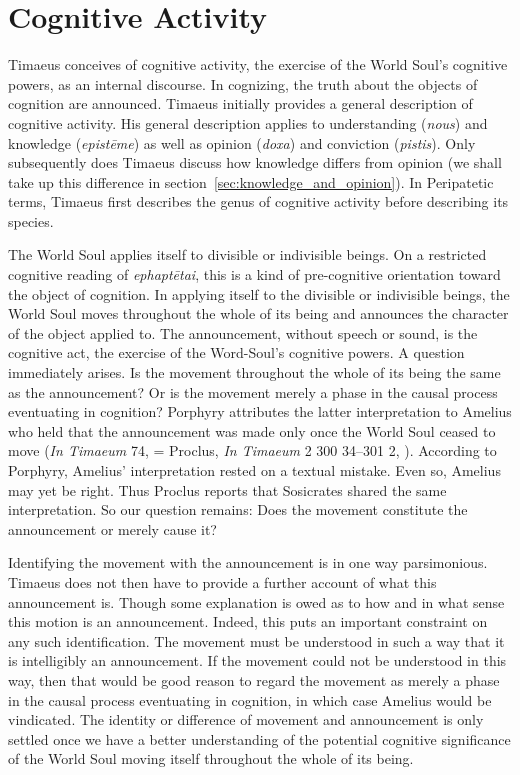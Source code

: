 


\section{Cognitive Activity} %
\label{sec:cognition}

Timaeus conceives of cognitive activity, the exercise of the World Soul's cognitive powers, as an internal discourse. In cognizing, the truth about the objects of cognition are announced. Timaeus initially provides a general description of cognitive activity. His general description applies to understanding (\emph{nous}) and knowledge (\emph{epistēme}) as well as opinion (\emph{doxa}) and conviction (\emph{pistis}). Only subsequently does Timaeus discuss how knowledge differs from opinion (we shall take up this difference in section~\ref{sec:knowledge_and_opinion}). In Peripatetic terms, Timaeus first describes the genus of cognitive activity before describing its species.

The World Soul applies itself to divisible or indivisible beings. On a restricted cognitive reading of \emph{ephaptētai}, this is a kind of pre-cognitive orientation toward the object of cognition. In applying itself to the divisible or indivisible beings, the World Soul moves throughout the whole of its being and announces the character of the object applied to. The announcement, without speech or sound, is the cognitive act, the exercise of the Word-Soul's cognitive powers. A question immediately arises. Is the movement throughout the whole of its being the same as the announcement? Or is the movement merely a phase in the causal process eventuating in cognition? Porphyry attributes the latter interpretation to Amelius who held that the announcement was made only once the World Soul ceased to move (\emph{In Timaeum} 74, \citealt{Sodano:1964mf} = Proclus, \emph{In Timaeum} 2 300 34--301 2, \citealt{Diehl:1903re}). According to Porphyry, Amelius' interpretation rested on a textual mistake. Even so, Amelius may yet be right. Thus Proclus reports that Sosicrates shared the same interpretation. So our question remains: Does the movement constitute the announcement or merely cause it?

Identifying the movement with the announcement is in one way parsimonious. Timaeus does not then have to provide a further account of what this announcement is. Though some explanation is owed as to how and in what sense this motion is an announcement. Indeed, this puts an important constraint on any such identification. The movement must be understood in such a way that it is intelligibly an announcement. If the movement could not be understood in this way, then that would be good reason to regard the movement as merely a phase in the causal process eventuating in cognition, in which case Amelius would be vindicated. The identity or difference of movement and announcement is only settled once we have a better understanding of the potential cognitive significance of the World Soul moving itself throughout the whole of its being.

